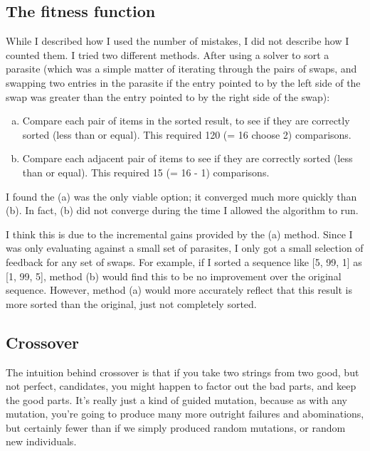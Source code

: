 \documentclass[11pt]{article}
\begin{document}
\subsection{The fitness function}

While I described how I used the number of mistakes, I did not describe how I counted them. I tried two different methods. After using a solver to sort a parasite (which was a simple matter of iterating through the pairs of swaps, and swapping two entries in the parasite if the entry pointed to by the left side of the swap was greater than the entry pointed to by the right side of the swap):
\begin{enumerate}[a.]
  \item Compare each pair of items in the sorted result, to see if they are correctly sorted (less than or equal). This required 120 (= 16 choose 2) comparisons.
  \item Compare each adjacent pair of items to see if they are correctly sorted (less than or equal). This required 15 (= 16 - 1) comparisons.
\end{enumerate}
I found the (a) was the only viable option; it converged much more quickly than (b). In fact, (b) did not converge during the time I allowed the algorithm to run.

I think this is due to the incremental gains provided by the (a) method. Since I was only evaluating against a small set of parasites, I only got a small selection of feedback for any set of swaps. For example, if I sorted a sequence like [5, 99, 1] as [1, 99, 5], method (b) would find this to be no improvement over the original sequence. However, method (a) would more accurately reflect that this result is more sorted than the original, just not completely sorted.


\subsection{Crossover}
The intuition behind crossover is that if you take two strings from two good, but not perfect, candidates, you might happen to factor out the bad parts, and keep the good parts. It's really just a kind of guided mutation, because as with any mutation, you're going to produce many more outright failures and abominations, but certainly fewer than if we simply produced random mutations, or random new individuals.
\end{document}
